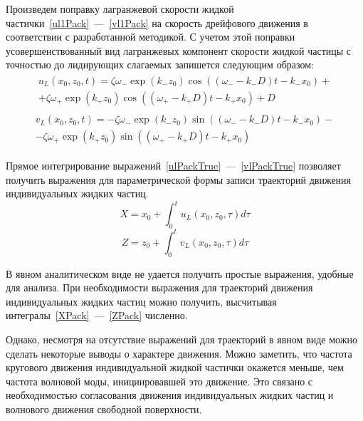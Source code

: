 Произведем поправку лагранжевой скорости жидкой частички~\eqref{ul1Pack}~---~\eqref{vl1Pack} на скорость дрейфового движения в соответствии с разработанной методикой. С учетом этой поправки усовершенствованный вид лагранжевых компонент скорости жидкой частицы с точностью до лидирующих слагаемых запишется следующим образом:
\begin{gather}
\begin{gathered}
u_{L}\left( x_{0}, z_{0}, t \right)=\zeta \omega_{-}\exp \left( k_{-} z_{0}\right) \cos \left( \left( \omega_{-}-k_{-} D\right) t - k_{-} x_{0} \right)+\\
+\zeta \omega_{+}\exp \left( k_{+} z_{0}\right) \cos \left( \left( \omega_{+}-k_{+} D\right)  t - k_{+} x_{0} \right)+D
\label{ulPackTrue}
\end{gathered}	  
\end{gather}
\begin{gather}	
\begin{gathered}
v_{L}\left( x_{0}, z_{0}, t \right)=-\zeta \omega_{-}\exp \left( k_{-} z_{0}\right) \sin \left( \left( \omega_{-}-k_{-} D\right) t - k_{-} x_{0} \right)-\\
-\zeta \omega_{+}\exp \left( k_{+} z_{0}\right) \sin \left( \left( \omega_{+}-k_{+} D\right)  t - k_{+} x_{0} \right)
\label{vlPackTrue}
\end{gathered}
\end{gather}	  	
	  	
Прямое интегрирование выражений~\eqref{ulPackTrue}~---~\eqref{vlPackTrue}  позволяет получить выражения для параметрической формы записи траекторий движения индивидуальных жидких частиц.
\begin{equation}
X=x_{0}+\int_{0}^{t}u_{L}\left( x_{0}, z_{0}, \tau \right)d\tau
\label{XPack}
\end{equation}
\begin{equation}
Z=z_{0}+\int_{0}^{t}v_{L}\left( x_{0}, z_{0}, \tau \right)d\tau
\label{ZPack}
\end{equation}	  	
	  	
В явном аналитическом виде не удается получить простые выражения, удобные для анализа. При необходимости выражения для траекторий движения индивидуальных жидких частиц можно получить, высчитывая интегралы~\eqref{XPack}~---~\eqref{ZPack} численно.

Однако, несмотря на отсутствие выражений для траекторий в явном виде можно сделать некоторые выводы о характере движения. Можно заметить, что частота кругового движения индивидуальной жидкой частички окажется меньше, чем частота волновой моды, инициировавшей это движение. Это связано с необходимостью согласования движения индивидуальных жидких частиц и волнового движения свободной поверхности.

